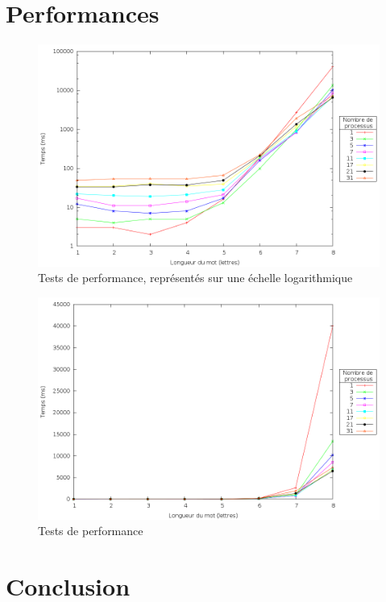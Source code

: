 \documentclass[a4paper,11pt]{article}
\begin{document}
\section{Performances}
\begin{figure}[h!]
  \centering
  \includegraphics[width=\textwidth]{plot_log.png}
  \caption{Tests de performance, représentés sur une échelle logarithmique}
  \label{perf_loga}
\end{figure}

\begin{figure}[h!]
  \centering
  \includegraphics[width=\textwidth]{plot.png}
  \caption{Tests de performance}
  \label{perf}
\end{figure}

\section{Conclusion}
\end{document}
